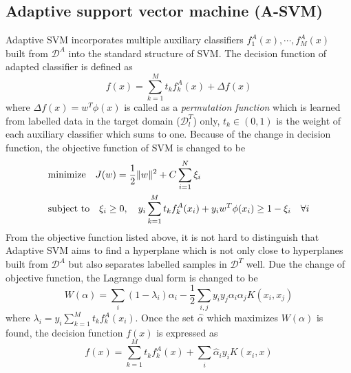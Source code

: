 \subsection{Adaptive support vector machine (A-SVM)}
Adaptive SVM \cite{yang2007cross} incorporates multiple auxiliary classifiers $f_1^A(x), \cdots, f_M^A(x)$ built from $\mathcal{D}^A$ into the standard structure of SVM. The decision function of adapted classifier is defined as
\begin{equation}
f(x) = \sum_{k=1}^M t_k f_{k}^A(x) + \Delta f(x)
\end{equation}
where $\Delta f(x) = w^T \phi(x)$ is called as a {\em permutation function} which is learned from labelled data in the target domain ($\mathcal{D}_l^T$) only, $t_k \in (0, 1)$ is the weight of each auxiliary classifier which sums to one. Because of the change in decision function, the objective function of SVM is changed to be
  \begin{eqnarray}
  & \text{minimize} \quad J(w) = \frac{1}{2} \lVert w \rVert^2 + C \sum_{i=1}^{N}\xi_i  \nonumber \\
  & \text{subject to} \quad \xi_i \ge 0, \quad y_i \sum_{k=1}^M t_k f_{k}^A(x_i) + y_i w^{T} \phi(x_i) \ge 1 - \xi_i \quad \forall i
  \end{eqnarray}
 From the objective function listed above, it is not hard to distinguish that Adaptive SVM aims to find a hyperplane which is not only close to hyperplanes built from $\mathcal{D}^A$ but also separates labelled samples in $\mathcal{D}^T$ well. Due the change of objective function, the Lagrange dual form is changed to be 
  \begin{equation}
  W(\alpha) = \sum_{i} (1 - \lambda_i) \alpha_i - \frac{1}{2} \sum_{i,j} y_i y_j \alpha_i \alpha_j K(x_i, x_j)
  \end{equation}
  where $\lambda_i = y_i \sum_{k=1}^M t_k f_{k}^A(x_i)$. Once the set $\hat \alpha$ which maximizes $W(\alpha)$ is found, the decision function $f(x)$ is expressed as 
 \begin{equation}
f(x) = \sum_{k=1}^M t_k f_{k}^A(x) + \sum_i \hat \alpha_i y_i K(x_i, x)
\end{equation}

